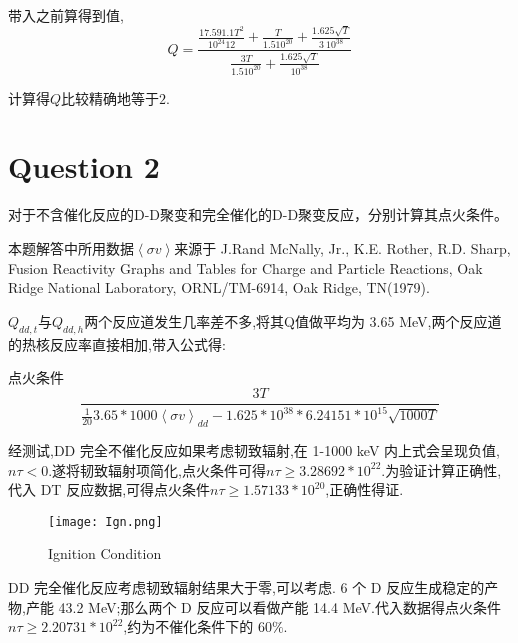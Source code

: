 \documentclass[UTF8,a4paper,10pt]{ctexart}
\begin{document}
带入之前算得到值,
\begin{equation}
    Q=\frac{\frac{17.59 1.1 T^2}{10^{24} 12}+\frac{T}{1.5 10^{20}}+\frac{1.625 \sqrt{T}}{3\ 10^{38}}}{\frac{3 T}{1.5 10^{20}}+\frac{1.625 \sqrt{T}}{10^{38}}}
\end{equation}

计算得$Q比较精确地等于2$.
\section*{Question 2}
对于不含催化反应的D-D聚变和完全催化的D-D聚变反应，分别计算其点火条件。


本题解答中所用数据$\left \langle \sigma v \right \rangle$来源于 J.Rand McNally, Jr., K.E. Rother, R.D. Sharp, Fusion Reactivity Graphs and Tables for Charge and Particle Reactions, Oak Ridge National Laboratory, ORNL/TM-6914, Oak Ridge, TN(1979).

$Q_{dd,t}$与$Q_{dd,h}$两个反应道发生几率差不多,将其Q值做平均为 3.65 MeV,两个反应道的热核反应率直接相加,带入公式得:

点火条件
\begin{equation}
    \frac{3 T}{\frac{1}{20} 3.65* 1000 \left \langle \sigma v \right \rangle_{dd}-1.625*10^{38}* 6.24151* 10^{15} \sqrt{1000 T}}
\end{equation}

经测试,DD 完全不催化反应如果考虑韧致辐射,在 1-1000 keV 内上式会呈现负值,$n\tau<0$.遂将韧致辐射项简化,点火条件可得$n\tau \geq 3.28692*10^{22}$.为验证计算正确性,代入 DT 反应数据,可得点火条件$n\tau \geq 1.57133*10^{20}$,正确性得证.

\begin{figure}[!htbp]
	\begin{center}
		\texttt{[image: Ign.png]}
		\caption{Ignition Condition}
	\end{center}
	\vspace{-0.5em}
\end{figure}


DD 完全催化反应考虑韧致辐射结果大于零,可以考虑. 6 个 D 反应生成稳定的产物,产能 43.2 MeV;那么两个 D 反应可以看做产能 14.4 MeV.代入数据得点火条件$n\tau \geq 2.20731*10^{22}$,约为不催化条件下的 $60\%$.
\end{document}
